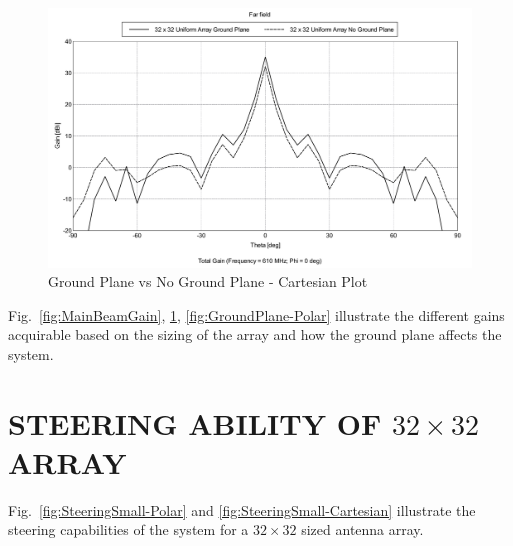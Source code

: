 \documentclass[11pt]{witseiepaper}
\begin{document}
\begin{bibunit}[witseie]
\begin{figure}[htb]
    \centering
    \includegraphics[width=\linewidth]{GroundPlane-Cartesian.pdf}
    \caption{Ground Plane vs No Ground Plane - Cartesian Plot}
    \label{fig:GroundPlane-Cartesian}
\end{figure}




Fig.~\ref{fig:MainBeamGain}, \ref{fig:GroundPlane-Cartesian}, \ref{fig:GroundPlane-Polar}  illustrate the different gains acquirable based on the sizing of the array and how the ground plane affects the system.

\section{STEERING ABILITY OF $32 \times 32$ ARRAY} \label{sec:SteeringAbility}
Fig.~\ref{fig:SteeringSmall-Polar} and \ref{fig:SteeringSmall-Cartesian} illustrate the steering capabilities of the system for a $32 \times 32$ sized antenna array.


\end{bibunit}
\end{document}
